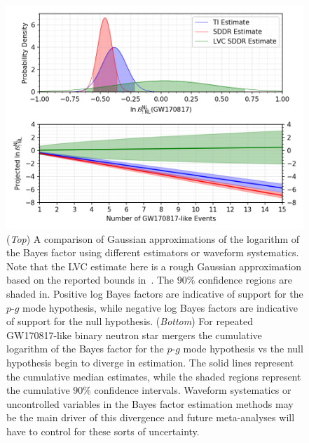 \begin{figure}[th]
\centering
\includegraphics[width=0.9\columnwidth]{figs/chapter6/sim_many_gw170817_evidence_error_prop.png}
\caption{(\textit{Top}) A comparison of Gaussian approximations of the logarithm of the Bayes factor using different estimators or waveform systematics. Note that the LVC estimate here is a rough Gaussian approximation based on the reported bounds in~\cite{abbott2019constraining}. The $90 \%$ confidence regions are shaded in. Positive log Bayes factors are indicative of support for the $p$-$g$ mode hypothesis, while negative log Bayes factors are indicative of support for the null hypothesis. (\textit{Bottom}) For repeated GW170817-like binary neutron star mergers the cumulative logarithm of the Bayes factor for the $p$-$g$ mode hypothesis vs the null hypothesis begin to diverge in estimation. The solid lines represent the cumulative median estimates, while the shaded regions represent the cumulative $90 \%$ confidence intervals. Waveform systematics or uncontrolled variables in the Bayes factor estimation methods may be the main driver of this divergence and future meta-analyses will have to control for these sorts of uncertainty.}
\label{fig:sim_many_gw170817_divergent_bayes}
\end{figure}


